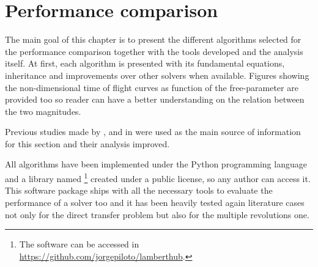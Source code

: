 \chapter{Performance comparison}

The main goal of this chapter is to present the different algorithms selected
for the performance comparison together with the tools developed and the
analysis itself. At first, each algorithm is presented with its
fundamental equations, inheritance and improvements over other solvers
when available. Figures showing the non-dimensional time of flight curves as
function of the free-parameter are provided too so reader can have a better
understanding on the relation between the two magnitudes.

Previous studies made by \cite{klumpp1999}, \cite{torre2015} and in
\cite{martinez2021} were used as the main source of information for this section
and their analysis improved. 

All algorithms have been implemented under the Python programming language and a
library named \footnote{The software can be accessed
in
\href{https://github.com/jorgepiloto/lamberthub}{https://github.com/jorgepiloto/lamberthub}.}
created under a public license, so any author can access it. This software
package ships with all the necessary tools to evaluate the performance of a
solver too and it has been heavily tested again literature cases not only for
the direct transfer problem but also for the multiple revolutions one.



